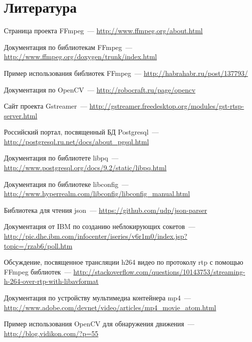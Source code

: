 \chapter*{Литература}

\renewcommand{\bibname}{Список источников}
\begin{thebibliography}{2013}

  Страница проекта FFmpeg~---
  \url{http://www.ffmpeg.org/about.html}

  Документация по библиотекам FFmpeg~---
  \url{http://www.ffmpeg.org/doxygen/trunk/index.html}

  Пример использования библиотек FFmpeg~---
  \url{http://habrahabr.ru/post/137793/}

  Документация по OpenCV~---
  \url{http://robocraft.ru/page/opencv}
  
  Сайт проекта Gstreamer~---
  \url{http://gstreamer.freedesktop.org/modules/gst-rtsp-server.html}

  Российский портал, посвященный БД Postgresql~---
  \url{http://postgresql.ru.net/docs/about_pgsql.html}

  Документация по библиотете libpq~---
  \url{http://www.postgresql.org/docs/9.2/static/libpq.html}

  Документация по библиотеке libconfig~---
  \url{http://www.hyperrealm.com/libconfig/libconfig_manual.html}

  Библиотека для чтения json~---
  \url{https://github.com/udp/json-parser}

  Документация от IBM по созданию неблокирующих сокетов~---
  \url{http://pic.dhe.ibm.com/infocenter/iseries/v6r1m0/index.jsp?topic=/rzab6/poll.htm}

  Обсуждение, посвященное трансляции h264 видео по протоколу rtp с помощью FFmpeg библиотек~---
  \url{http://stackoverflow.com/questions/10143753/streaming-h-264-over-rtp-with-libavformat}

  Документация по устройству мультимедиа контейнера mp4~---
  \url{http://www.adobe.com/devnet/video/articles/mp4_movie_atom.html}

  Пример использования OpenCV для обнаружения движения~---
  \url{http://blog.vidikon.com/?p=55}


\end{thebibliography}
